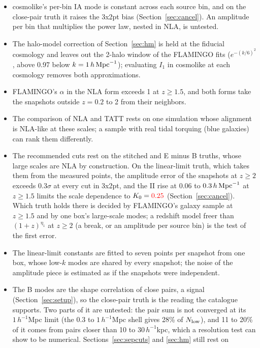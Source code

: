 \documentclass[11pt]{article}
\newcommand{\hMpc}{\,h\,{\rm Mpc}^{-1}}
\newcommand{\Om}{\Omega_{\rm m}}
\newif\ifnumbersfinal
\newcommand{\refresh}[1]{\ifnumbersfinal#1\else\textcolor{red}{#1}\fi}
\newcommand{\LLcutT}{\refresh{0.25}}
\newcommand{\Tol}{0.3}
\begin{document}
\begin{itemize}
    $A_s$ and $\Om$.
  \item cosmolike's per-bin IA mode is constant across each source bin, and
    on the close-pair truth it raises the 3x2pt bias (Section~\ref{sec:cancel}).
    An amplitude per bin that multiplies the power law, nested in NLA, is
    untested.
  \item The halo-model correction of Section~\ref{sec:hm} is held at the
    fiducial cosmology and leaves out the 2-halo window of the FLAMINGO fits
    ($e^{-(k/6)^2}$, above 0.97 below $k = 1\hMpc$); evaluating $I_1$ in
    cosmolike at each cosmology removes both approximations.
  \item FLAMINGO's $\alpha$ in the NLA form exceeds 1 at $z \ge 1.5$, and
    both forms take the snapshots outside $z = 0.2$ to 2 from their
    neighbors.
  \item The comparison of NLA and TATT rests on one simulation whose
    alignment is NLA-like at these scales; a sample with real tidal
    torquing (blue galaxies) can rank them differently.
  \item The recommended cuts rest on the stitched and E minus B truths, whose
    large scales are NLA by construction. On the linear-limit truth, which takes them from
    the measured points, the amplitude error of the snapshots at $z \ge 2$
    exceeds \Tol$\sigma$ at every cut in 3x2pt, and the II rise at 0.06 to
    $0.3\hMpc$ at $z \ge 1.5$ limits the scale dependence to $K_0 =
    \LLcutT$ (Section~\ref{sec:cancel}). Which truth holds there is decided
    by FLAMINGO's galaxy sample at $z \ge 1.5$ and by one box's large-scale
    modes; a redshift model freer than $(1+z)^{\eta_1}$ at $z \ge 2$ (a
    break, or an amplitude per source bin) is the test of the first error.
  \item The linear-limit constants are fitted to seven points per snapshot
    from one box, whose low-$k$ modes are shared by every snapshot; the
    noise of the amplitude piece is estimated as if the snapshots were
    independent.
  \item The B modes are the shape correlation of close pairs, a signal
    (Section~\ref{sec:setup}), so the close-pair truth is the reading the
    catalogue supports. Two parts of it are untested: the pair sum is not
    converged at its $1\,h^{-1}$Mpc limit (the 0.3 to $1\,h^{-1}$Mpc shell
    gives 28\% of $N_{\rm low}$), and 11 to 20\% of it comes from pairs
    closer than 10 to $30\,h^{-1}$kpc, which a resolution test can show to
    be numerical. Sections~\ref{sec:sepcuts} and \ref{sec:hm} still rest on

\end{itemize}
\end{document}
